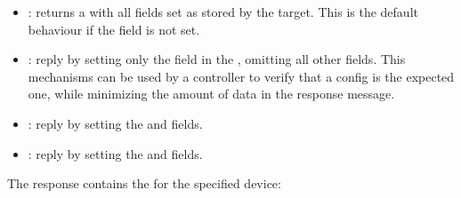 \documentclass[11pt]{article}
\begin{document}
{%
\begin{itemize}%

\item{}
: returns a  with all fields
set as stored by the target. This is the default behaviour if the
 field is not set.%

\item{}
: reply by setting only the  field in the
, omitting all other fields. This mechanisms can be
used by a controller to verify that a config is the expected one, while
minimizing the amount of data in the response message.%

\item{}
: reply by setting the  and  fields.%

\item{}
: reply by setting the  and
 fields.%
\end{itemize}%

\noindent{}The response contains the  for the specified device:%

}
\end{document}
